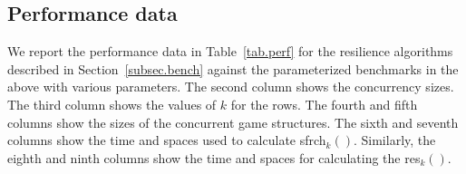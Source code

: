 \documentclass[times,10pt,twocolumn]{article}
\begin{document}
\subsection{Performance data \label{subsec.exp}} 

We report the performance data 
in Table~\ref{tab.perf} for the resilience algorithms 
described in Section~\ref{subsec.bench} 
against the parameterized benchmarks in the above with various 
parameters.  
The second column shows the concurrency sizes.  
The third column shows the values of $k$ for the rows.  
The fourth and fifth columns show the sizes of the concurrent game structures.  
The sixth and seventh columns show the time and spaces used to calculate 
sfrch$_k()$.  
Similarly, the eighth and ninth columns show the time and spaces for calculating 
the res$_k()$.  
\end{document}
